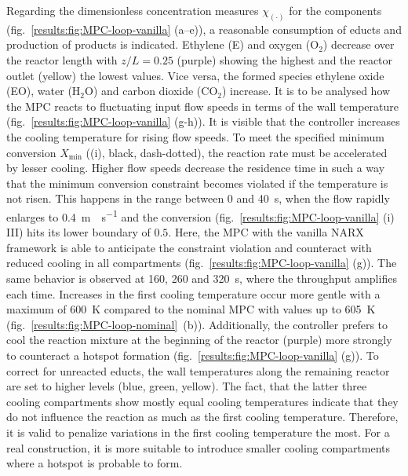 \noindent
Regarding the dimensionless concentration measures $\chi_{(\cdot)}$ for the components
(fig.~\ref{results:fig:MPC-loop-vanilla} (a–e)), 
a reasonable consumption of educts and production of products is indicated.
Ethylene (E) and oxygen (O$_2$) decrease over the reactor length with $z/L = 0.25$ (purple)
showing the highest and the reactor outlet (yellow) the lowest values.
Vice versa, the formed species ethylene oxide (EO), water (H$_2$O) and carbon dioxide (CO$_2$)
increase.
\newline
\newline
\noindent
It is to be analysed how the MPC reacts to fluctuating input flow speeds in terms of
the wall temperature (fig.~\ref{results:fig:MPC-loop-vanilla} (g-h)).
It is visible that the controller increases the cooling temperature for rising flow speeds.
To meet the specified minimum conversion $X_\text{min}$ ((i), black, dash-dotted),
the reaction rate must be accelerated by lesser cooling.
Higher flow speeds decrease the residence time in such a way that the minimum conversion constraint
becomes violated if the temperature is not risen.
This happens in the range between \SI{0}{} and \SI{40}{\second}, when the flow rapidly enlarges
to \SI{0.4}{\meter \; \second^{-1}} and the conversion (fig.~\ref{results:fig:MPC-loop-vanilla} (i) III)
hits its lower boundary of $0.5$. Here, the MPC with the vanilla NARX framework is able 
to anticipate the constraint violation and counteract with reduced cooling in all compartments
(fig.~\ref{results:fig:MPC-loop-vanilla} (g)). The same behavior is observed at \SI{160}{}, \SI{260}{}
and \SI{320}{\second}, where the throughput amplifies each time.
Increases in the first cooling temperature occur more gentle with a maximum
of \SI{600}{\kelvin} compared to the nominal MPC
with values up to \SI{605}{\kelvin} (fig.~\ref{results:fig:MPC-loop-nominal}~(b)).
Additionally, the controller prefers to cool the reaction mixture at the beginning of the reactor (purple)
more strongly to counteract a hotspot formation (fig.~\ref{results:fig:MPC-loop-vanilla} (g)).
To correct for unreacted educts, the wall temperatures
along the remaining reactor are set to higher levels (blue, green, yellow). The fact, that
the latter three cooling compartments show mostly equal cooling temperatures indicate that they do not 
influence the reaction as much as the first cooling temperature. 
Therefore, it is valid to penalize variations in the first cooling temperature the most.
For a real construction, it is more
suitable to introduce smaller cooling compartments where a hotspot is probable to form.
